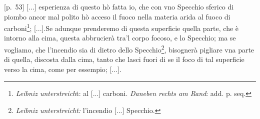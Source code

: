 \pstart {}[p.~53] [...] esperienza di questo h\`{o} fatta io, che con vno Specchio\protect{} sferico di piombo\protect{} ancor mal polito h\`{o} acceso il fuoco nella materia arida al fuoco di carboni\footnote{\textit{Leibniz unterstreich}t: al [...] carboni. \textit{Daneben rechts am Rand}: add. p. seq.}; [...].\pend \pstart Se adunque prenderemo di questa superficie quella parte, che \`{e} intorno alla cima, questa abbrucier\`{a} tra'l corpo focoso, e lo Specchio\protect{}; ma se vogliamo, che l'incendio sia di dietro dello Specchio\protect{}\footnote{\textit{Leibniz unterstreicht:} l'incendio [...] Specchio\protect{}.{\vrule height 0pt depth 10mm width 0pt}}, bisogner\`{a} pigliare vna parte di quella, discosta dalla cima, tanto che lasci fuori di se il foco di tal superficie verso la cima, come per essempio; [...]. \pend \newpage